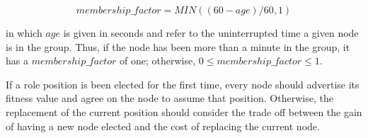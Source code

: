 $$
membership\_factor = MIN((60 - age)/60, 1)
$$

\noindent
in which $age$ is given in seconds and refer to the uninterrupted time a given node is in the group. Thus, if the node has been more than a minute in the group, it has a $membership\_factor$ of one; otherwise, $0 \le membership\_factor \le 1$.

If a role position is been elected for the first time, every node should advertise its fitness value and agree on the node to assume that position. Otherwise, the replacement of the current position should consider the trade off between the gain of having a new node elected and the cost of replacing the current node. 








%
%
%
%


